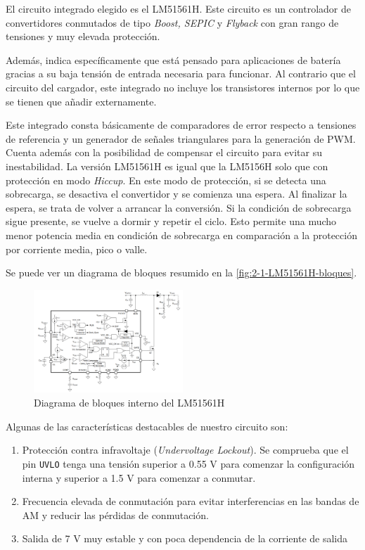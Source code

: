 El circuito integrado elegido es el LM51561H. Este circuito es un controlador de convertidores conmutados de tipo \textit{Boost, SEPIC} y \textit{Flyback} con gran rango de tensiones y muy elevada protección. \cite{LM51561HDataSheete}

Además, indica específicamente que está pensado para aplicaciones de batería gracias a su baja tensión de entrada necesaria para funcionar. Al contrario que el circuito del cargador, este integrado no incluye los transistores internos por lo que se tienen que añadir externamente. 

Este integrado consta básicamente de comparadores de error respecto a tensiones de referencia y un generador de señales triangulares para la generación de PWM. Cuenta además con la posibilidad de compensar el circuito para evitar su inestabilidad. La versión LM51561H es igual que la LM5156H solo que con protección en modo \textit{Hiccup}. En este modo de protección, si se detecta una sobrecarga, se desactiva el convertidor y se comienza una espera. Al finalizar la espera, se trata de volver a arrancar la conversión. Si la condición de sobrecarga sigue presente, se vuelve a dormir y repetir el ciclo. Esto permite una mucho menor potencia media en condición de sobrecarga en comparación a la protección por corriente media, pico o valle. \cite{hariImprovePowerConverter}

Se puede ver un diagrama de bloques resumido en la \autoref{fig:2-1-LM51561H-bloques}.


\begin{figure}[h]
    \centering
    \includegraphics[width=0.5\textwidth]{images/2/2-1/LM51561HBloques.png}
    \caption{Diagrama de bloques interno del LM51561H}
    \label{fig:2-1-LM51561H-bloques}
\end{figure}

Algunas de las características destacables de nuestro circuito son:
\begin{enumerate}
    \item Protección contra infravoltaje (\textit{Undervoltage Lockout}). Se comprueba que el pin \texttt{UVLO} tenga una tensión superior a 0.55 V para comenzar la configuración interna y superior a 1.5 V para comenzar a conmutar.
    \item Frecuencia elevada de conmutación para evitar interferencias en las bandas de AM y reducir las pérdidas de conmutación.
    \item Salida de 7 V muy estable y con poca dependencia de la corriente de salida
\end{enumerate}

